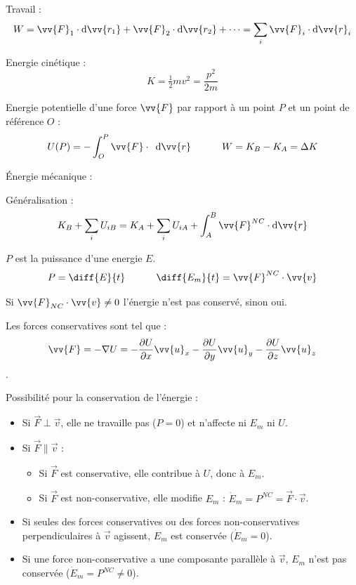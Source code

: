 \documentclass[landscape,a4paper]{article}
\newcommand{\req}[2]{
  \begin{center}
    \scalebox{#1}{
      \begin{tabular}{c}
        \(\displaystyle
        #2
        \)
      \end{tabular}
    }
  \end{center}
}
\newcommand{\dee}[1]{
  \,\,\,\mathrm{d}{#1}
}
\newcommand{\F}{\ensuremath{\vv{F}}}
\newcommand{\pos}{\ensuremath{\vv{r}}}
\newcommand{\vi}{\ensuremath{\vv{v}}}
\newcommand{\ux}{\ensuremath{\vv{u}_x}}
\newcommand{\uy}{\ensuremath{\vv{u}_y}}
\newcommand{\uz}{\ensuremath{\vv{u}_z}}
\begin{document}
\begin{multicols}{4}
  Travail : 
  \[
    W= \F_1\cdot\mathrm{d}\vv{r_1} + \F_2\cdot\mathrm{d}\vv{r_2} + \dots =\sum_i \F_i\cdot\mathrm{d}\pos_i
  \]

  Energie cinétique :
  \[
    K = \tfrac{1}{2}mv^2 = \frac{p^2}{2m}
  \]

  Energie potentielle d'une force \F{} par rapport à un point \(P\) et un point de référence \(O\) : 
  \[
    U(P)=-\int_O^P\F\cdot\dee{\pos}\phantom{texttex} W = K_B - K_A = \Delta K
  \]

  Énergie mécanique :
  \req{1}{
    E_m = K + \sum_i U_i
  }

  Généralisation : 
  \[
    K_B + \sum_i U_{iB} = K_A + \sum_i U_{iA} + \int_A^B \F^{NC}\cdot\mathrm{d}\pos
  \]

  \(P\) est la puissance d'une energie \(E\). 
  \[
    P = \diff{E}{t} \phantom{textext} \diff{E_m}{t} = \F^{NC}\cdot\vi
  \]

  Si \(\F_{NC}\cdot\vi \neq 0 \) l'énergie n'est pas conservé, sinon oui. 

  Les forces conservatives sont tel que :
  \[
    \F=-\nabla U=-\frac{\partial U}{\partial x}\ux-\frac{\partial U}{\partial y}\uy-\frac{\partial U}{\partial z}\uz
  \].

  Possibilité pour la conservation de l'énergie : 
  \begin{itemize}
    \item Si \(\vec{F} \perp \vec{v}\), elle ne travaille pas (\(P = 0\)) et n'affecte ni \(E_m\) ni \(U\).
    \item Si \(\vec{F} \parallel \vec{v}\) :
      \begin{itemize}
        \item Si \(\vec{F}\) est conservative, elle contribue à \(U\), donc à \(E_m\).
        \item Si \(\vec{F}\) est non-conservative, elle modifie \(E_m\) : \(\dot{E}_m = P^{NC} = \vec{F} \cdot \vec{v}\).
      \end{itemize}
    \item Si seules des forces conservatives ou des forces non-conservatives perpendiculaires à \(\vec{v}\) agissent, \(E_m\) est conservée (\(\dot{E}_m = 0\)).
    \item Si une force non-conservative a une composante parallèle à \(\vec{v}\), \(E_m\) n'est pas conservée (\(\dot{E}_m = P^{NC} \neq 0\)).
  \end{itemize}


\end{multicols}
\end{document}
